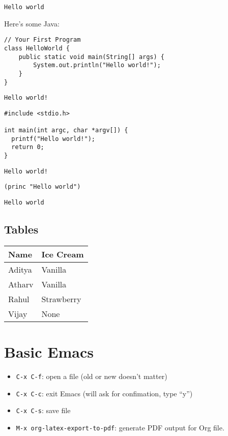 \documentclass[11pt]{article}
\begin{document}
\begin{verbatim}
Hello world
\end{verbatim}


Here's some Java:

\begin{verbatim}
// Your First Program
class HelloWorld {
    public static void main(String[] args) {
        System.out.println("Hello world!");
    }
}
\end{verbatim}

\begin{verbatim}
Hello world!
\end{verbatim}


\begin{verbatim}
#include <stdio.h>

int main(int argc, char *argv[]) {
  printf("Hello world!");
  return 0;
}
\end{verbatim}

\begin{verbatim}
Hello world!
\end{verbatim}


\begin{verbatim}
(princ "Hello world")
\end{verbatim}

\begin{verbatim}
Hello world
\end{verbatim}

\subsection{Tables}
\label{sec:org6efc597}

\begin{center}
\begin{tabular}{ll}
Name & Ice Cream\\
\hline
Aditya & Vanilla\\
Atharv & Vanilla\\
Rahul & Strawberry\\
Vijay & None\\
\end{tabular}
\end{center}

\section{Basic Emacs}
\label{sec:orgf9d4aea}

\begin{itemize}
\item \texttt{C-x C-f}: open a file (old or new doesn't matter)
\item \texttt{C-x C-c}: exit Emacs (will ask for confimation, type ``y'')
\item \texttt{C-x C-s}: save file
\item \texttt{M-x org-latex-export-to-pdf}: generate PDF output for Org file.
\end{itemize}
\end{document}
